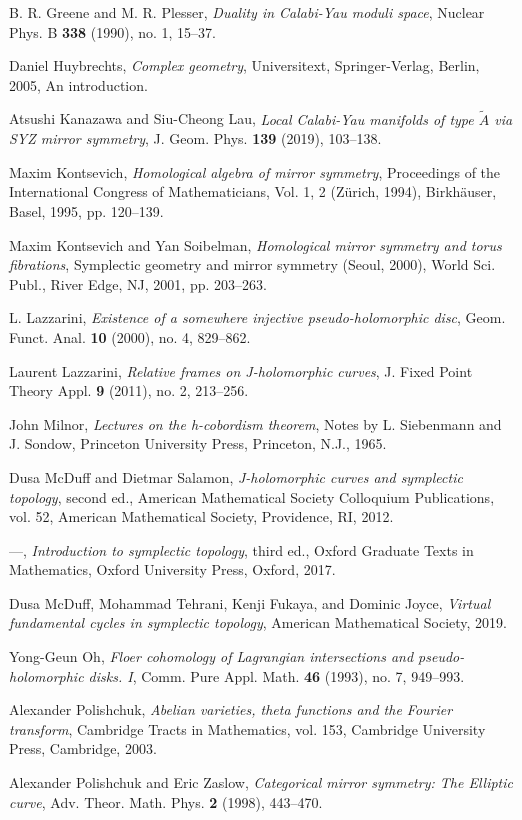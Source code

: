 \begin{description}[leftmargin=7.4em, labelwidth=6.8em, labelsep=0.6em,
                   font=\normalfont, itemsep=0.35em, parsep=0pt]
\item[{[GP90]}] B. R. Greene and M. R. Plesser, \emph{Duality in Calabi-Yau moduli space}, Nuclear Phys. B \textbf{338} (1990), no. 1, 15--37.
\item[{[Huy05]}] Daniel Huybrechts, \emph{Complex geometry}, Universitext, Springer-Verlag, Berlin, 2005, An introduction.
\item[{[KL19]}] Atsushi Kanazawa and Siu-Cheong Lau, \emph{Local Calabi-Yau manifolds of type $\widetilde{A}$ via SYZ mirror symmetry}, J. Geom. Phys. \textbf{139} (2019), 103--138.
\item[{[Kon95]}] Maxim Kontsevich, \emph{Homological algebra of mirror symmetry}, Proceedings of the International Congress of Mathematicians, Vol. 1, 2 (Z\"urich, 1994), Birkh\"auser, Basel, 1995, pp. 120--139.
\item[{[KS01]}] Maxim Kontsevich and Yan Soibelman, \emph{Homological mirror symmetry and torus fibrations}, Symplectic geometry and mirror symmetry (Seoul, 2000), World Sci. Publ., River Edge, NJ, 2001, pp. 203--263.
\item[{[Laz00]}] L. Lazzarini, \emph{Existence of a somewhere injective pseudo-holomorphic disc}, Geom. Funct. Anal. \textbf{10} (2000), no. 4, 829--862.
\item[{[Laz11]}] Laurent Lazzarini, \emph{Relative frames on J-holomorphic curves}, J. Fixed Point Theory Appl. \textbf{9} (2011), no. 2, 213--256.
\item[{[Mil65]}] John Milnor, \emph{Lectures on the h-cobordism theorem}, Notes by L. Siebenmann and J. Sondow, Princeton University Press, Princeton, N.J., 1965.
\item[{[MS12]}] Dusa McDuff and Dietmar Salamon, \emph{J-holomorphic curves and symplectic topology}, second ed., American Mathematical Society Colloquium Publications, vol. 52, American Mathematical Society, Providence, RI, 2012.
\item[{[MS17]}] ---, \emph{Introduction to symplectic topology}, third ed., Oxford Graduate Texts in Mathematics, Oxford University Press, Oxford, 2017.
\item[{[MTFJ19]}] Dusa McDuff, Mohammad Tehrani, Kenji Fukaya, and Dominic Joyce, \emph{Virtual fundamental cycles in symplectic topology}, American Mathematical Society, 2019.
\item[{[Oh93]}] Yong-Geun Oh, \emph{Floer cohomology of Lagrangian intersections and pseudo-holomorphic disks. I}, Comm. Pure Appl. Math. \textbf{46} (1993), no. 7, 949--993.
\item[{[Pol03]}] Alexander Polishchuk, \emph{Abelian varieties, theta functions and the Fourier transform}, Cambridge Tracts in Mathematics, vol. 153, Cambridge University Press, Cambridge, 2003.
\item[{[PZ98]}] Alexander Polishchuk and Eric Zaslow, \emph{Categorical mirror symmetry: The Elliptic curve}, Adv. Theor. Math. Phys. \textbf{2} (1998), 443--470.


\end{description}
